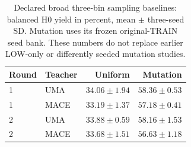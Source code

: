 \begin{table}[htbp]
\centering\small
\caption{Declared broad three-bin sampling baselines: balanced H0 yield in percent, mean $\pm$ three-seed SD. Mutation uses its frozen original-TRAIN seed bank. These numbers do not replace earlier LOW-only or differently seeded mutation studies.}
\begin{tabular}{llrr}\toprule
Round & Teacher & Uniform & Mutation\\\midrule
1 & UMA & $34.06\pm1.94$ & $58.36\pm0.53$\\
1 & MACE & $33.19\pm1.37$ & $57.18\pm0.41$\\
2 & UMA & $33.88\pm0.59$ & $58.16\pm1.53$\\
2 & MACE & $33.68\pm1.51$ & $56.63\pm1.18$\\
\bottomrule\end{tabular}
\end{table}
